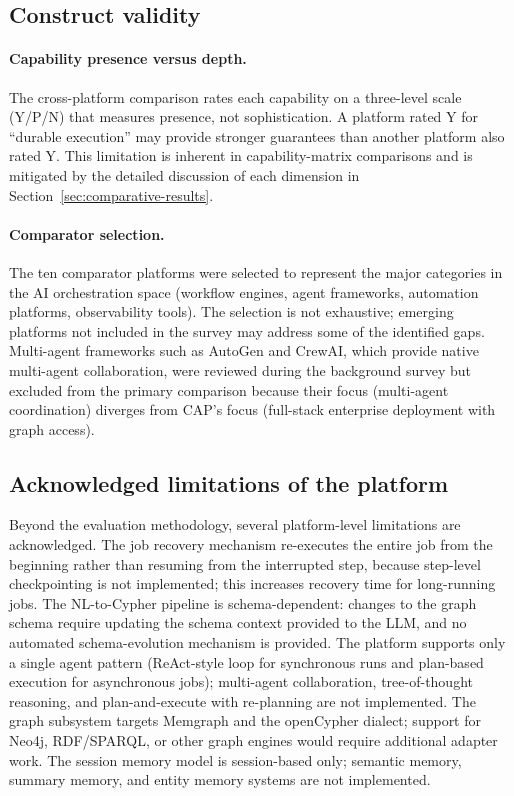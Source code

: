 \documentclass[a4paper,noexaminfo]{sapthesis}
\begin{document}
\subsection{Construct validity}

\paragraph{Capability presence versus depth.}
The cross-platform comparison rates each capability on a three-level
scale (Y/P/N) that measures presence, not sophistication.  A platform
rated Y for ``durable execution'' may provide stronger guarantees than
another platform also rated Y.  This limitation is inherent in
capability-matrix comparisons and is mitigated by the detailed
discussion of each dimension in Section~\ref{sec:comparative-results}.

\paragraph{Comparator selection.}
The ten comparator platforms were selected to represent the major
categories in the AI orchestration space (workflow engines, agent
frameworks, automation platforms, observability tools).  The selection
is not exhaustive; emerging platforms not included in the survey may
address some of the identified gaps.  Multi-agent frameworks such as
AutoGen and CrewAI, which provide native multi-agent collaboration,
were reviewed during the background survey but excluded from the
primary comparison because their focus (multi-agent coordination)
diverges from CAP's focus (full-stack enterprise deployment with graph
access).

\subsection{Acknowledged limitations of the platform}

Beyond the evaluation methodology, several platform-level limitations
are acknowledged.  The job recovery mechanism re-executes the entire
job from the beginning rather than resuming from the interrupted step,
because step-level checkpointing is not implemented; this increases
recovery time for long-running jobs.  The NL-to-Cypher pipeline is
schema-dependent: changes to the graph schema require updating the
schema context provided to the LLM, and no automated schema-evolution
mechanism is provided.  The platform supports only a single agent
pattern (ReAct-style loop for synchronous runs and plan-based
execution for asynchronous jobs); multi-agent collaboration,
tree-of-thought reasoning, and plan-and-execute with re-planning are
not implemented.  The graph subsystem targets Memgraph and the
openCypher dialect; support for Neo4j, RDF/SPARQL, or other graph
engines would require additional adapter work.  The session memory
model is session-based only; semantic memory, summary memory, and
entity memory systems are not implemented.
\end{document}
